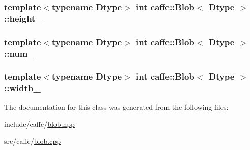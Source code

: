 \hypertarget{classcaffe_1_1_blob_ada72205fe499a098a6d17b4b1cd34a82}{
\subsubsection[{height\+\_\+}]{\setlength{\rightskip}{0pt plus 5cm}template$<$typename Dtype$>$ int {\bf caffe\+::\+Blob}$<$ Dtype $>$\+::height\+\_\+\hspace{0.3cm}{\ttfamily [protected]}}}\label{classcaffe_1_1_blob_ada72205fe499a098a6d17b4b1cd34a82}
\hypertarget{classcaffe_1_1_blob_a1af8433c8c66ae8f2732aa4d102b6c29}{
\subsubsection[{num\+\_\+}]{\setlength{\rightskip}{0pt plus 5cm}template$<$typename Dtype$>$ int {\bf caffe\+::\+Blob}$<$ Dtype $>$\+::num\+\_\+\hspace{0.3cm}{\ttfamily [protected]}}}\label{classcaffe_1_1_blob_a1af8433c8c66ae8f2732aa4d102b6c29}
\hypertarget{classcaffe_1_1_blob_a5ea591a12504b44d94e3715d88fb37a9}{
\subsubsection[{width\+\_\+}]{\setlength{\rightskip}{0pt plus 5cm}template$<$typename Dtype$>$ int {\bf caffe\+::\+Blob}$<$ Dtype $>$\+::width\+\_\+\hspace{0.3cm}{\ttfamily [protected]}}}\label{classcaffe_1_1_blob_a5ea591a12504b44d94e3715d88fb37a9}


The documentation for this class was generated from the following files\+:\begin{DoxyCompactItemize}
\item 
include/caffe/\hyperlink{blob_8hpp}{blob.\+hpp}\item 
src/caffe/\hyperlink{blob_8cpp}{blob.\+cpp}\end{DoxyCompactItemize}
